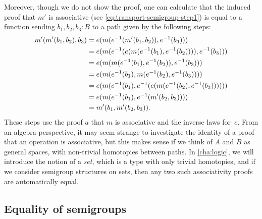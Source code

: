 Moreover, though we do not show the proof, one can calculate that the
induced proof that $m'$ is associative (see \eqref{eq:transport-semigroup-step1})
is equal to a function sending
$b_1,b_2,b_3 : B$ to a path given by the following steps:
\begin{equation}
  \label{eq:transport-semigroup-assoc}
  \begin{aligned}
    m'(m'(b_1,b_2),b_3)
    &= e(m(\opp{e}(m'(b_1,b_2)),\opp{e}(b_3))) \\
    &= e(m(\opp{e}(e(m(\opp{e}(b_1),\opp{e}(b_2)))),\opp{e}(b_3))) \\
    &= e(m(m(\opp{e}(b_1),\opp{e}(b_2)),\opp{e}(b_3))) \\
    &= e(m(\opp{e}(b_1),m(\opp{e}(b_2),\opp{e}(b_3)))) \\
    &= e(m(\opp{e}(b_1),\opp{e}(e(m(\opp{e}(b_2),\opp{e}(b_3)))))) \\
    &= e(m(\opp{e}(b_1),\opp{e}(m'(b_2,b_3)))) \\
    &= m'(b_1,m'(b_2,b_3)).
\end{aligned}
\end{equation}
These steps use the proof $a$ that $m$ is associative and the inverse
laws for~$e$.  From an algebra perspective, it may seem strange to
investigate the identity of a proof that an operation is associative,
but this makes sense if we think of $A$ and $B$ as general spaces, with
non-trivial homotopies between paths.  In \cref{cha:logic}, we will
introduce the notion of a \emph{set}, which is a type with only trivial
homotopies, and if we consider semigroup structures on sets, then any
two such associativity proofs are automatically equal.

\subsection{Equality of semigroups}
\label{sec:equality-semigroups}

